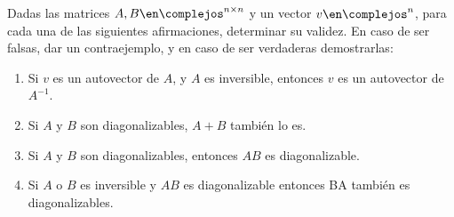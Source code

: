 \begin{enunciado}{\ejExtra}
  Dadas las matrices $A, B \en \complejos^{n \times n}$ y un vector $v \en \complejos^n$, para cada una de las siguientes afirmaciones, determinar
  su validez. En caso de ser falsas, dar un contraejemplo, y en caso de ser verdaderas demostrarlas:
  \begin{enumerate}[label=(\alph*)]
    \item Si $v$ es un autovector de $A$, y $A$ es inversible, entonces $v$ es un autovector de $A^{-1}$.

    \item Si $A$ y $B$ son diagonalizables, $A+B$ también lo es.

    \item Si $A$ y $B$ son diagonalizables, entonces $AB$ es diagonalizable.

    \item Si $A$ o $B$ es inversible y $AB$ es diagonalizable entonces BA también es diagonalizables.
  \end{enumerate}
\end{enunciado}


